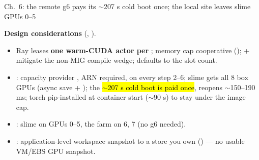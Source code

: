 \begin{frame}{Ch.\ 6: the remote g6 pays its $\sim$207 s cold boot once; the local site leaves slime GPUs 0--5}
{\footnotesize\textbf{\color{awsteal}Design considerations} (, ).\par}
\vspace{1mm}
\begin{itemize}\footnotesize\setlength{\itemsep}{2.2mm}
\item Ray leases \textbf{one warm-CUDA actor per }; memory cap cooperative (\allowbreak{});   +  mitigate the non-MIG compile wedge;  defaults to the slot count.
\item \textbf{}: capacity provider , ARN required,  on every step 2--6; slime gets all 8 box GPUs (async save + ); the \hl{$\sim$207 s cold boot is paid once}, reopens $\sim$150--190 ms; torch pip-installed at container start ($\sim$90 s) to stay under the image cap.
\item \textbf{}: slime on GPUs 0--5, the farm on 6, 7 (no g6 needed).
\item \textbf{}: application-level workspace snapshot to a store you own (\allowbreak{}) --- no usable VM/EBS GPU snapshot.
\end{itemize}
\end{frame}

